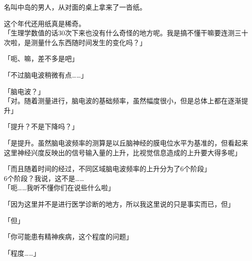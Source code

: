 名叫中岛的男人，从对面的桌上拿来了一沓纸。

这个年代还用纸真是稀奇。\\

「生理学数值的话30次下来也没有什么奇怪的地方呢。我是搞不懂干嘛要连测三十次啦，是测量什么东西随时间发生的变化吗？」

「呃、嘛，差不多是吧」

「不过脑电波稍微有点……」

「脑电波？」\\

「对。随着测量进行，脑电波的基础频率，虽然幅度很小，但是总体上都在逐渐提升」

「提升？不是下降吗？」

「是提升。虽然脑电波频率的测算是以丘脑神经的膜电位水平为基准的，但看起来这里神经兴度反映出的信号输入量的上升，比视觉信息造成的上升要大得多呢」

「而且随着时间的经过，不同区域脑电波频率的上升分为了6个阶段」\\

6个阶段？我说，这不是……\\

「呃……我听不懂你们在说些什么啦」

「因为这里并不是进行医学诊断的地方，所以我这里说的只是事实而已，但」

「但」

「你可能患有精神疾病，这个程度的问题」

「程度……」

